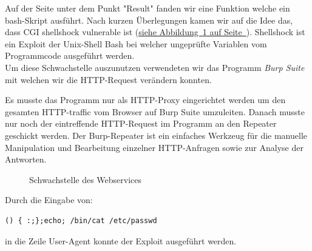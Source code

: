 \documentclass[12pt,a4paper,titlepage,oneside]{scrartcl}
\begin{document}
Auf der Seite unter dem Punkt "Result" fanden wir eine Funktion welche ein bash-Skript ausführt. Nach kurzen Überlegungen kamen wir auf die Idee das, dass CGI shellshock vulnerable ist (\hyperref[fig:logo4]{siehe Abbildung~\ref*{fig:logo4} auf Seite~\pageref*{fig:logo4}}).
Shellshock ist ein Exploit der Unix-Shell Bash bei welcher ungeprüfte Variablen vom Programmcode ausgeführt werden.\\Um diese Schwachstelle auszunutzen verwendeten wir das Programm \textit{Burp Suite} mit welchen wir die HTTP-Request verändern konnten.

Es musste das Programm nur als HTTP-Proxy eingerichtet werden um den gesamten HTTP-traffic vom Browser auf Burp Suite umzuleiten.
Danach musste nur noch der eintreffende HTTP-Request im Programm an den Repeater geschickt werden. Der Burp-Repeater ist ein einfaches Werkzeug für die manuelle Manipulation und Bearbeitung einzelner HTTP-Anfragen sowie zur Analyse der Antworten.

\begin{figure}[h!]
  \centering
  \caption{Schwachstelle des Webservices}
  \label{fig:logo4}
\end{figure}

Durch die Eingabe von: 
\begin{lstlisting}[caption=Exploit script,style=simple]
() { :;};echo; /bin/cat /etc/passwd
\end{lstlisting} in die Zeile User-Agent konnte der Exploit ausgeführt werden.  
\end{document}
